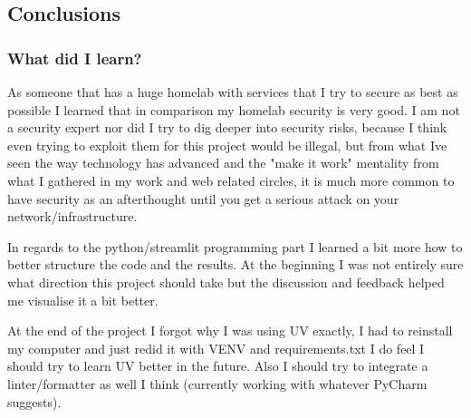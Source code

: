 \documentclass[11pt,a4paper]{article}
\begin{document}
\begin{Conclusions}
\subsection{Conclusions}
\subsubsection{What did I learn?}
As someone that has a huge homelab with services that I try to secure as best as possible I learned that in comparison my
homelab security is very good. I am not a security expert nor did I try to dig deeper into security risks, because I think even
trying to exploit them for this project would be illegal, but from what Ive seen the way technology has advanced and the "make it work"
mentality from what I gathered in my work and web related circles, it is much more common to have security as an afterthought until
you get a serious attack on your network/infrastructure.


In regards to the python/streamlit programming part I learned a bit more how to better structure the code and the results. At the beginning
I was not entirely sure what direction this project should take but the discussion and feedback helped me visualise it a bit better.


At the end of the project I forgot why I was using UV exactly, I had to reinstall my computer and just redid it with VENV and requirements.txt
I do feel I should try to learn UV better in the future. Also I should try to integrate a linter/formatter as well I think (currently working with whatever PyCharm suggests).

\end{Conclusions}
\end{document}
